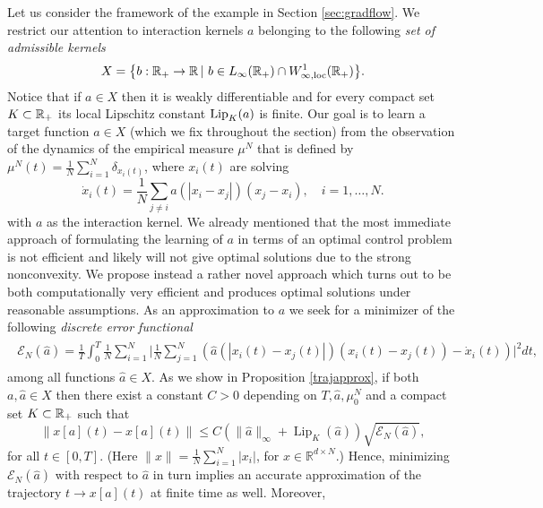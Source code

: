 Let us consider the framework of the example in Section \ref{sec:gradflow}. We restrict our attention to interaction kernels $a$ belonging to the following \textit{set of admissible kernels}
\begin{align*}
	X=\bigl\{b:\mathbb{R}_+\rightarrow\mathbb{R}\,|\ b \in L_{\infty}(\mathbb{R}_+) \cap W^{1}_{\infty,\textup{loc}}(\mathbb{R}_+) \bigr \}.
\end{align*}
Notice that if $a \in X$ then it is weakly differentiable and for every compact set $K \subset \mathbb{R}_+$ its local Lipschitz constant $\textup{Lip}_{K}(a)$ is finite.
Our goal is to learn a target function $a \in X$ (which we fix throughout the section) from the observation of the dynamics of the empirical measure $\mu^N$ that is defined by $\mu^N(t)=\frac{1}{N} \sum_{i=1}^N \delta_{x_i(t)}$, where $x_i(t)$ are solving
\begin{equation}\label{fdgradientflow2}
\dot x_i(t) = \frac{1}{N} \sum_{j \neq i} a(| x_i -  x_j |) (x_j - x_i), \quad i=1,\dots,N.
\end{equation}
with $a$ as the interaction kernel. We already mentioned that the  most immediate approach of formulating the learning of $a$ in terms of an optimal control problem is not efficient and likely will not give optimal solutions due to the strong nonconvexity. We propose instead a rather novel approach which turns out to be both computationally very efficient and   produces optimal solutions under reasonable assumptions. As an approximation to $a$ we seek for a minimizer of the following \textit{discrete error functional}
\begin{align}\label{eq-def-error1}
	\begin{split}
	\mathcal E_N(\widehat a) = \frac{1}{T}\int_0^T\frac{1}{N}\sum_{i=1}^N\biggl|\frac{1}{N}\sum_{j=1}^N
			\left(\widehat a(|x_i(t)-x_j(t)|)(x_i(t) - x_j(t))-\dot{x}_i(t)\right)\biggr|^2 dt,
	\end{split}
\end{align}
among all functions $\widehat a \in X$. As we show in Proposition \ref{trajapprox}, if both $a, \widehat a \in X$ then there exist a constant $C>0$ depending on $T, \widehat a, \mu_0^N$ and a compact set $K \subset \mathbb{R}_+$ such that
$$
\| x[a](t) -x[a](t) \| \leq C (\|\widehat a\|_\infty + \operatorname{Lip}_K(\widehat a)) \sqrt{\mathcal E_N(\widehat a)}, 
$$
for all $t \in [0,T]$. (Here $\| x \| = \frac{1}{N} \sum_{i=1}^N |x_i|$, for $x \in \mathbb R^{d \times N}$.) Hence, minimizing $\mathcal E_N(\widehat a)$ with respect to $\widehat a$ in turn implies an accurate approximation of the trajectory $t \to x[a](t)$ at finite time as well. Moreover,
